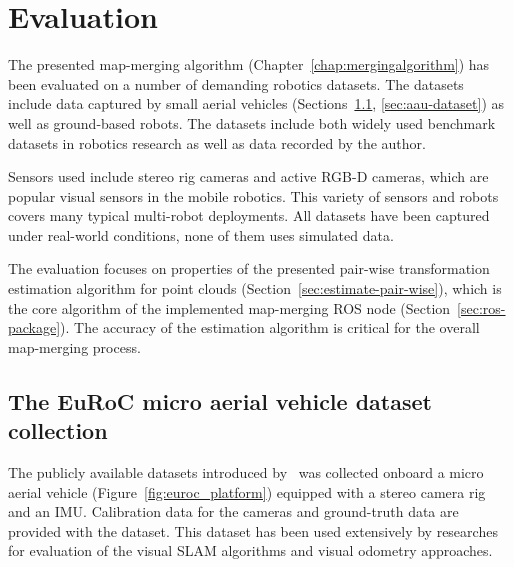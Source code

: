 \chapter{Evaluation}
\label{chap:evaluation}

The presented map-merging algorithm (Chapter~\ref{chap:mergingalgorithm}) has been evaluated on a number of demanding robotics datasets. The datasets include data captured by small aerial vehicles (Sections~\ref{sec:euroc-dataset}, \ref{sec:aau-dataset}) as well as ground-based robots. The datasets include both widely used benchmark datasets in robotics research as well as data recorded by the author.

Sensors used include stereo rig cameras and active \gls{RGB-D} cameras, which are popular visual sensors in the mobile robotics. This variety of sensors and robots covers many typical multi-robot deployments. All datasets have been captured under real-world conditions, none of them uses simulated data.

The evaluation focuses on properties of the presented pair-wise transformation estimation algorithm for point clouds (Section~\ref{sec:estimate-pair-wise}), which is the core algorithm of the implemented map-merging \gls{ROS} node (Section~\ref{sec:ros-package}). The accuracy of the estimation algorithm is critical for the overall map-merging process.

\section{The EuRoC micro aerial vehicle dataset collection}
\label{sec:euroc-dataset}

The publicly available datasets introduced by~\citet{Burri2016} was collected onboard a micro aerial vehicle (Figure~\ref{fig:euroc_platform}) equipped with a stereo camera rig and an \gls{IMU}. Calibration data for the cameras and ground-truth data are provided with the dataset. This dataset has been used extensively by researches for evaluation of the visual \gls{SLAM} algorithms and visual odometry approaches.

